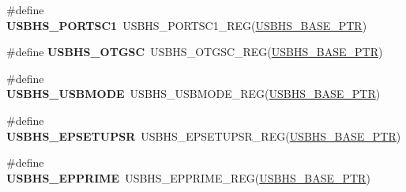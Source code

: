 \begin{DoxyCompactItemize}
\item 
\hypertarget{group___u_s_b_h_s___register___accessor___macros_ga852151680b62dedcbdb51464a4861975}{}\#define {\bfseries U\+S\+B\+H\+S\+\_\+\+P\+O\+R\+T\+S\+C1}~U\+S\+B\+H\+S\+\_\+\+P\+O\+R\+T\+S\+C1\+\_\+\+R\+E\+G(\hyperlink{group___u_s_b_h_s___peripheral_gaa2bc10b8cd66f96acd39e15b3a581306}{U\+S\+B\+H\+S\+\_\+\+B\+A\+S\+E\+\_\+\+P\+T\+R})\label{group___u_s_b_h_s___register___accessor___macros_ga852151680b62dedcbdb51464a4861975}

\item 
\hypertarget{group___u_s_b_h_s___register___accessor___macros_ga4c62d9a22ed4d47fb63c6023dbc869b0}{}\#define {\bfseries U\+S\+B\+H\+S\+\_\+\+O\+T\+G\+S\+C}~U\+S\+B\+H\+S\+\_\+\+O\+T\+G\+S\+C\+\_\+\+R\+E\+G(\hyperlink{group___u_s_b_h_s___peripheral_gaa2bc10b8cd66f96acd39e15b3a581306}{U\+S\+B\+H\+S\+\_\+\+B\+A\+S\+E\+\_\+\+P\+T\+R})\label{group___u_s_b_h_s___register___accessor___macros_ga4c62d9a22ed4d47fb63c6023dbc869b0}

\item 
\hypertarget{group___u_s_b_h_s___register___accessor___macros_gacb60842d7d5611cad6b647c10c874802}{}\#define {\bfseries U\+S\+B\+H\+S\+\_\+\+U\+S\+B\+M\+O\+D\+E}~U\+S\+B\+H\+S\+\_\+\+U\+S\+B\+M\+O\+D\+E\+\_\+\+R\+E\+G(\hyperlink{group___u_s_b_h_s___peripheral_gaa2bc10b8cd66f96acd39e15b3a581306}{U\+S\+B\+H\+S\+\_\+\+B\+A\+S\+E\+\_\+\+P\+T\+R})\label{group___u_s_b_h_s___register___accessor___macros_gacb60842d7d5611cad6b647c10c874802}

\item 
\hypertarget{group___u_s_b_h_s___register___accessor___macros_ga4eb3da0525fed396cb3498984bdd26a2}{}\#define {\bfseries U\+S\+B\+H\+S\+\_\+\+E\+P\+S\+E\+T\+U\+P\+S\+R}~U\+S\+B\+H\+S\+\_\+\+E\+P\+S\+E\+T\+U\+P\+S\+R\+\_\+\+R\+E\+G(\hyperlink{group___u_s_b_h_s___peripheral_gaa2bc10b8cd66f96acd39e15b3a581306}{U\+S\+B\+H\+S\+\_\+\+B\+A\+S\+E\+\_\+\+P\+T\+R})\label{group___u_s_b_h_s___register___accessor___macros_ga4eb3da0525fed396cb3498984bdd26a2}

\item 
\hypertarget{group___u_s_b_h_s___register___accessor___macros_ga98e45e0241601d36cdeac49949d71bb6}{}\#define {\bfseries U\+S\+B\+H\+S\+\_\+\+E\+P\+P\+R\+I\+M\+E}~U\+S\+B\+H\+S\+\_\+\+E\+P\+P\+R\+I\+M\+E\+\_\+\+R\+E\+G(\hyperlink{group___u_s_b_h_s___peripheral_gaa2bc10b8cd66f96acd39e15b3a581306}{U\+S\+B\+H\+S\+\_\+\+B\+A\+S\+E\+\_\+\+P\+T\+R})\label{group___u_s_b_h_s___register___accessor___macros_ga98e45e0241601d36cdeac49949d71bb6}


\end{DoxyCompactItemize}
